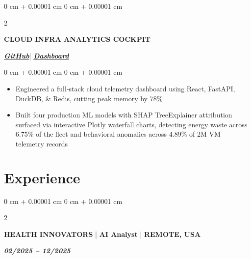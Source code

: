 \documentclass[10pt, letterpaper]{article}
\newenvironment{highlights}{
    \begin{itemize}[
        topsep=0.10 cm,
        parsep=0.10 cm,
        partopsep=0pt,
        itemsep=0pt,
        leftmargin=0 cm + 10pt
    ]
}{
    \end{itemize}
} %
\newenvironment{onecolentry}{
    \begin{adjustwidth}{
        0 cm + 0.00001 cm
    }{
        0 cm + 0.00001 cm
    }
}{
    \end{adjustwidth}
} %
\newenvironment{twocolentry}[2][]{
    \onecolentry
    \def\secondColumn{#2}
    \setcolumnwidth{\fill, 4.5 cm}
    \begin{paracol}{2}
}{
    \switchcolumn \raggedleft \secondColumn
    \end{paracol}
    \endonecolentry
} %
\begin{document}
    \begin{twocolentry}{
           \href{https://github.com/krantiyeole20/Cloud-Infra-Analytics-Cockpit}{\textbf{\textit{GitHub}}}| \href{https://cloud-infra-analytics-cockpit.vercel.app/}{\textbf{\textit{Dashboard}}}
       }
           \textbf{CLOUD INFRA ANALYTICS COCKPIT}
\end{twocolentry}
\begin{onecolentry}
    \begin{highlights}
    \item Engineered a full-stack cloud telemetry dashboard using React, FastAPI, DuckDB, \& Redis, cutting peak memory by 78\%
    \item Built four production ML models with SHAP TreeExplainer attribution surfaced via interactive Plotly waterfall charts, detecting energy waste across 6.75\% of the fleet and behavioral anomalies across 4.89\% of 2M VM telemetry records  
    \end{highlights}

    
    
     
\end{onecolentry}
    
    \section{Experience}

 \begin{twocolentry}{\textit{\textbf{02/2025 – 12/2025}}}
    \textbf{HEALTH INNOVATORS} | \textbf{AI Analyst} | \textbf{REMOTE, USA}
    
\end{twocolentry}
\end{document}
